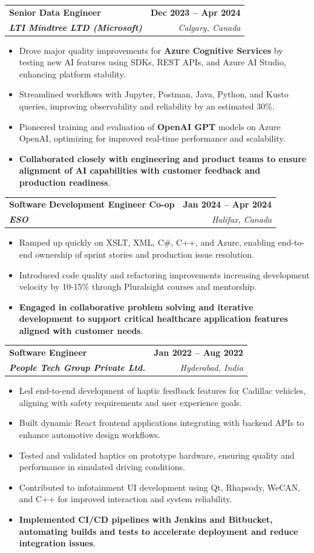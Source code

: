 \documentclass[letterpaper,11pt]{article}
\makeatletter
\newcommand{\resumeItem}[1]{
  \item\small{
    {#1 \vspace{-2pt}}
  }
}
\newcommand{\resumeSubheading}[4]{
  \vspace{-2pt}\item
    \begin{tabular*}{1.0\textwidth}[t]{l@{\extracolsep{\fill}}r}
      \textbf{#1} & \textbf{\small #2} \\
      \textit{\small#3} & \textit{\small #4} \\
    \end{tabular*}\vspace{-7pt}
}
\newcommand{\resumeItemListStart}{\begin{itemize}}
\newcommand{\resumeItemListEnd}{\end{itemize}\vspace{-5pt}}
\makeatother
\begin{document}
    \resumeSubheading
      {\textbf{Senior Data Engineer}}{\textbf{Dec 2023 -- Apr 2024}}
      {\textbf{LTI Mindtree LTD (Microsoft)}}{Calgary, Canada}
      \resumeItemListStart
        \resumeItem{Drove major quality improvements for \textbf{Azure Cognitive Services} by testing new AI features using SDKs, REST APIs, and Azure AI Studio, enhancing platform stability.}
        \resumeItem{Streamlined workflows with Jupyter, Postman, Java, Python, and Kusto queries, improving observability and reliability by an estimated 30\%.}
        \resumeItem{Pioneered training and evaluation of \textbf{OpenAI GPT} models on Azure OpenAI, optimizing for improved real-time performance and scalability.}
        \resumeItem{\textbf{Collaborated closely with engineering and product teams to ensure alignment of AI capabilities with customer feedback and production readiness}.}
      \resumeItemListEnd
    
    \resumeSubheading
      {\textbf{Software Development Engineer Co-op}}{\textbf{Jan 2024 -- Apr 2024}}
      {\textbf{ESO}}{Halifax, Canada}
      \resumeItemListStart
        \resumeItem{Ramped up quickly on XSLT, XML, C\#, C++, and Azure, enabling end-to-end ownership of sprint stories and production issue resolution.}
        \resumeItem{Introduced code quality and refactoring improvements increasing development velocity by 10-15\% through Pluralsight courses and mentorship.}
        \resumeItem{\textbf{Engaged in collaborative problem solving and iterative development to support critical healthcare application features aligned with customer needs}.}
      \resumeItemListEnd

    \resumeSubheading
      {\textbf{Software Engineer}}{\textbf{Jan 2022 -- Aug 2022}}
      {\textbf{People Tech Group Private Ltd.}}{Hyderabad, India}
      \resumeItemListStart
        \resumeItem{Led end-to-end development of haptic feedback features for Cadillac vehicles, aligning with safety requirements and user experience goals.}
        \resumeItem{Built dynamic React frontend applications integrating with backend APIs to enhance automotive design workflows.}
        \resumeItem{Tested and validated haptics on prototype hardware, ensuring quality and performance in simulated driving conditions.}
        \resumeItem{Contributed to infotainment UI development using Qt, Rhapsody, WeCAN, and C++ for improved interaction and system reliability.}
        \resumeItem{\textbf{Implemented CI/CD pipelines with Jenkins and Bitbucket, automating builds and tests to accelerate deployment and reduce integration issues}.}
      \resumeItemListEnd
\end{document}
